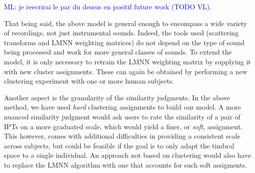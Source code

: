 \documentclass{bmcart}
\newcommand{\ml}[1]{\textcolor{blue}{ML: #1}\xspace}
\begin{document}
\ml{je reecrirai le par du dessus en positif future work (TODO VL).}

That being said, the above model is general enough to encompass a wide variety of recordings, not just instrumental sounds.
Indeed, the tools used (scattering transforms and LMNN weighting matrices) do not depend on the type of sound being processed and work for more general classes of sounds.
To extend the model, it is only necessary to retrain the LMNN weighting matrix by supplying it with new cluster assignments.
These can again be obtained by performing a new clustering experiment with one or more human subjects.

Another aspect is the granularity of the similarity judgments.
In the above method, we have used \emph{hard} clustering assignments to build our model.
A more nuanced similarity judgment would ask users to rate the similarity of a pair of IPTs on a more graduated scale, which would yield a finer, or \emph{soft}, assignment.
This however, comes with additional difficulties in providing a consistent scale across subjects, but could be feasible if the goal is to only adapt the timbral space to a single individual.
An approach not based on clustering would also have to replace the LMNN algorithm with one that accounts for such soft assigments.

\end{document}
